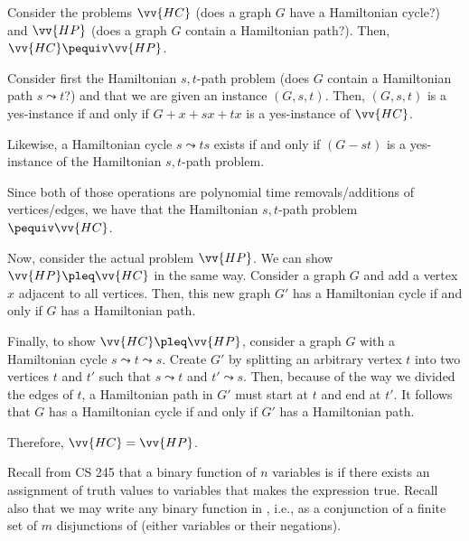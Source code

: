 \begin{prop}
  Consider the problems $\vv{HC}$ (does a graph $G$ have a Hamiltonian cycle?)\@
  and $\vv{HP}$ (does a graph $G$ contain a Hamiltonian path?).
  Then, $\vv{HC} \pequiv \vv{HP}$.
\end{prop}
\begin{prf}
  Consider first the Hamiltonian $s,t$-path problem
  (does $G$ contain a Hamiltonian path $s \leadsto t$?)
  and that we are given an instance $(G, s, t)$.
  Then, $(G, s, t)$ is a yes-instance if and only if
  $G+x+sx+tx$ is a yes-instance of $\vv{HC}$.

  Likewise, a Hamiltonian cycle $s \leadsto ts$
  exists if and only if $(G - st)$ is a yes-instance
  of the Hamiltonian $s,t$-path problem.

  Since both of those operations are polynomial time
  removals/additions of vertices/edges,
  we have that the Hamiltonian $s,t$-path problem $\pequiv \vv{HC}$.

  Now, consider the actual problem $\vv{HP}$.
  We can show $\vv{HP} \pleq \vv{HC}$ in the same way.
  Consider a graph $G$ and add a vertex $x$ adjacent to all vertices.
  Then, this new graph $G'$ has a Hamiltonian cycle
  if and only if $G$ has a Hamiltonian path.

  Finally, to show $\vv{HC} \pleq \vv{HP}$,
  consider a graph $G$ with a Hamiltonian cycle
  $s \leadsto t \leadsto s$.
  Create $G'$ by splitting an arbitrary vertex $t$
  into two vertices $t$ and $t'$ such that $s \leadsto t$ and $t' \leadsto s$.
  Then, because of the way we divided the edges of $t$,
  a Hamiltonian path in $G'$ must start at $t$ and end at $t'$.
  It follows that $G$ has a Hamiltonian cycle if and only if
  $G'$ has a Hamiltonian path.

  Therefore, $\vv{HC} = \vv{HP}$.
\end{prf}

Recall from CS 245 that a binary function of $n$ variables is 
if there exists an assignment of truth values to variables that makes the expression true.
Recall also that we may write any binary function
in , i.e., as a conjunction
of a finite set of $m$ disjunctions of  (either variables or their negations).

